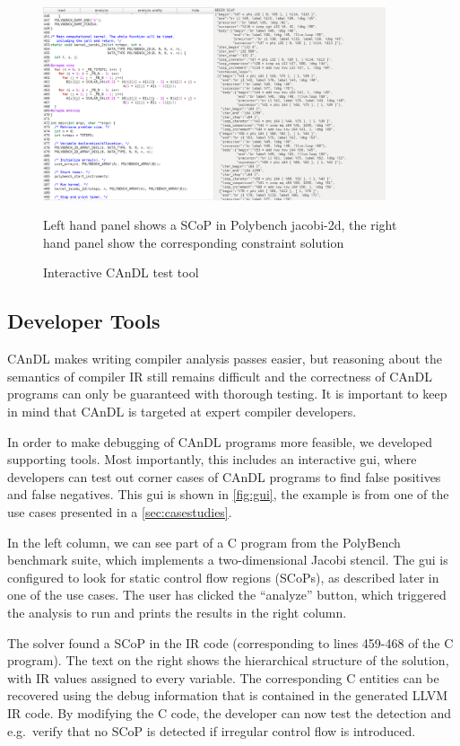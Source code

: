 \begin{figure}[ht]
\centering
\includegraphics[width=0.9\textwidth]{figures/visual_gui2.png}
\caption{Interactive CAnDL test tool}
\medskip
\small
Left hand panel shows a SCoP in Polybench jacobi-2d, the right hand panel show the corresponding constraint solution
\label{fig:gui}
\end{figure}

\subsection{Developer Tools}

    CAnDL makes writing compiler analysis passes easier, but reasoning about the
    semantics of compiler IR still remains difficult and the correctness of
    CAnDL programs can only be guaranteed with thorough testing.
    It is important to keep in mind that CAnDL is targeted at expert compiler
    developers.

    In order to make debugging of CAnDL programs more feasible, we developed
    supporting tools.
    Most importantly, this includes an interactive gui, where developers can
    test out corner cases of CAnDL programs to find false positives and false
    negatives.
    This gui is shown in \autoref{fig:gui}, the example is from one of the use
    cases presented in a \autoref{sec:casestudies}.

    In the left column, we can see part of a C program from the PolyBench
    benchmark suite, which implements a two-dimensional Jacobi stencil.
    The gui is configured to look for static control flow regions (SCoPs), as
    described later in one of the use cases.
    The user has clicked the ``analyze'' button, which triggered the analysis to
    run and prints the results in the right column.

    The solver found a SCoP in the IR code (corresponding to lines 459-468 of
    the C program).
    The text on the right shows the hierarchical structure of the solution, with
    IR values assigned to every variable.
    The corresponding C entities can be recovered using the debug
    information that is contained in the generated LLVM IR code.
    By modifying the C code, the developer can now test the detection and
    e.g.\ verify that no SCoP is detected if irregular control flow is
    introduced.


